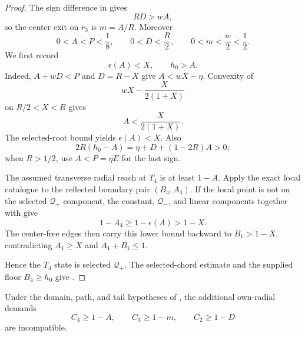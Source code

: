 \begin{proof}
The sign difference in  gives
\[
 RD>wA,
\]
so the center exit on $r_3$ is $m=A/R$.  Moreover
\begin{equation}
 0<A<P<\frac18,
 \qquad 0<D<\frac R2,
 \qquad 0<m<\frac w2<\frac12.
 \label{eq:ce1-small-parameters}
\end{equation}
We first record
\begin{equation}
 \epsilon(A)<X,
 \qquad h_0>A.
 \label{eq:ce1-root-height}
\end{equation}
Indeed, $A+wD<P$ and $D=R-X$ give $A<wX-\eta$.  Convexity of
\[
 wX-\frac{X}{2(1+X)}
\]
on $R/2<X<R$ gives
\[
 A<\frac{X}{2(1+X)}.
\]
The selected-root bound
 yields $\epsilon(A)<X$.  Also
\[
 2R(h_0-A)=\eta+D+(1-2R)A>0;
\]
when $R>1/2$, use $A<P=\eta E$ for the last sign.

The assumed transverse radial reach at $T_4$ is at least $1-A$.  Apply the
exact local catalogue to the reflected boundary pair $(B_4,A_4)$.  If the
local point is not on the selected $\mathcal Q_+$ component, the constant, $\mathcal Q_-$,
and linear components together with  give
\[
 1-A_4\ge1-\epsilon(A)>1-X.
\]
The center-free edges then carry this lower bound backward to
$B_1>1-X$, contradicting $A_1\ge X$ and $A_1+B_1\le1$.

Hence the $T_4$ state is selected $\mathcal Q_+$. The selected-chord estimate
 and the supplied floor $B_4\ge h_0$
give .
\end{proof}

\begin{proposition}
\label{prop:new-ce1-direct-certificate}
Under the domain, path, and tail hypotheses of
, the additional own-radial demands
\begin{equation}
 C_4\ge1-A,\qquad C_3\ge1-m,\qquad C_2\ge1-D
 \label{eq:ce1-radial-hypotheses}
\end{equation}
are incompatible.
\end{proposition}


